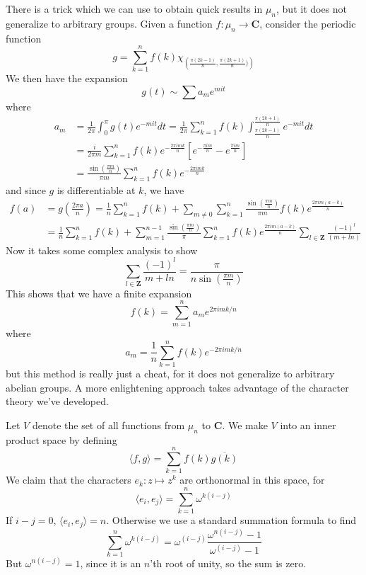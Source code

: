 There is a trick which we can use to obtain quick results in $\mu_n$, but it does not generalize to arbitrary groups. Given a function $f: \mu_n \to \mathbf{C}$, consider the periodic function
%
\[ g = \sum_{k = 1}^n f(k) \chi_{\left(\frac{\pi (2k - 1)}{n}, \frac{\pi (2k + 1)}{n})\right)} \]
%
We then have the expansion
%
\[ g(t) \sim \sum a_m e^{m i t} \]
%
where
%
\begin{align*}
    a_m &= \frac{1}{2 \pi} \int_0^\pi g(t) e^{-mit} dt = \frac{1}{2 \pi} \sum_{k = 1}^n f(k) \int_{\frac{\pi (2k - 1)}{n}}^{\frac{\pi (2k + 1)}{n}} e^{-mit} dt\\
    &= \frac{i}{2 \pi m} \sum_{k = 1}^n f(k) e^{- \frac{2 \pi i m k}{n}} \left[ e^{-\frac{\pi i m}{n}} - e^{\frac{\pi i m}{n}} \right]\\
    &= \frac{\sin\left(\frac{\pi m}{n}\right)}{\pi m} \sum_{k = 1}^n f(k) e^{- \frac{2 \pi i m k}{n}}
\end{align*}
%
and since $g$ is differentiable at $k$, we have
%
\begin{align*}
    f(a) &= g\left( \frac{2 \pi a}{n} \right) = \frac{1}{n} \sum_{k = 1}^n f(k) + \sum_{m \neq 0} \sum_{k = 1}^n \frac{\sin(\frac{\pi m}{n})}{\pi m} f(k) e^{\frac{2 \pi i m (a - k)}{n}}\\
    &= \frac{1}{n} \sum_{k = 1}^n f(k) + \sum_{m = 1}^{n-1} \frac{\sin\left(\frac{\pi m}{n}\right)}{\pi} \sum_{k = 1}^n f(k) e^{\frac{2 \pi i m (a - k)}{n}} \sum_{l \in \mathbf{Z}} \frac{(-1)^l}{(m + ln)}
\end{align*}
%
Now it takes some complex analysis to show
%
\[ \sum_{l \in \mathbf{Z}} \frac{(-1)^l}{m + ln} = \frac{\pi}{n \sin(\frac{\pi m}{n})} \]
%
This shows that we have a finite expansion
%
\[ f(k) = \sum_{m = 1}^n a_m e^{2 \pi i mk/n} \]
%
where
%
\[ a_m = \frac{1}{n} \sum_{k = 1}^n f(k) e^{- 2 \pi i mk /n} \]
%
but this method is really just a cheat, for it does not generalize to arbitrary abelian groups. A more enlightening approach takes advantage of the character theory we've developed.

Let $V$ denote the set of all functions from $\mu_n$ to $\mathbf{C}$. We make $V$ into an inner product space by defining
%
\[ \langle f, g \rangle = \sum_{k = 1}^n f(k) \overline{g(k)} \]
%
We claim that the characters $e_k: z \mapsto z^k$ are orthonormal in this space, for
%
\[ \langle e_i, e_j \rangle = \sum_{k = 1}^n \omega^{k(i-j)} \]
%
If $i - j = 0$, $\langle e_i, e_j \rangle = n$. Otherwise we use a standard summation formula to find
%
\[ \sum_{k = 1}^n \omega^{k(i-j)} = \omega^{(i-j)} \frac{\omega^{n(i-j)} - 1}{\omega^{(i-j)} -1} \]
%
But $\omega^{n(i-j)} = 1$, since it is an $n$'th root of unity, so the sum is zero.

